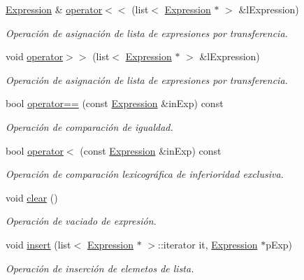\begin{DoxyCompactItemize}
\hyperlink{class_expression}{Expression} \& \hyperlink{class_expression_a79f76778966b233f97217ed5c2cdefde}{operator$<$$<$} (list$<$ \hyperlink{class_expression}{Expression} $\ast$ $>$ \&l\+Expression)
\begin{DoxyCompactList}\small\item\em Operación de asignación de lista de expresiones por transferencia. \end{DoxyCompactList}\item 
void \hyperlink{class_expression_a21a202129abc628e19cebc38ad532dcc}{operator$>$$>$} (list$<$ \hyperlink{class_expression}{Expression} $\ast$ $>$ \&l\+Expression)
\begin{DoxyCompactList}\small\item\em Operación de asignación de lista de expresiones por transferencia. \end{DoxyCompactList}\item 
bool \hyperlink{class_expression_a8cd982884bef615b9c79526dce0956f6}{operator==} (const \hyperlink{class_expression}{Expression} \&in\+Exp) const 
\begin{DoxyCompactList}\small\item\em Operación de comparación de igualdad. \end{DoxyCompactList}\item 
bool \hyperlink{class_expression_a4f1f64418752d14e116f55b7b57355b8}{operator$<$} (const \hyperlink{class_expression}{Expression} \&in\+Exp) const 
\begin{DoxyCompactList}\small\item\em Operación de comparación lexicográfica de inferioridad exclusiva. \end{DoxyCompactList}\item 
void \hyperlink{class_expression_ab2e0ccb0146cccd559c39f8913f9585e}{clear} ()
\begin{DoxyCompactList}\small\item\em Operación de vaciado de expresión. \end{DoxyCompactList}\item 
void \hyperlink{class_expression_a2f087974bb5cee7d0ea06838f5d68ba8}{insert} (list$<$ \hyperlink{class_expression}{Expression} $\ast$ $>$\+::iterator it, \hyperlink{class_expression}{Expression} $\ast$p\+Exp)
\begin{DoxyCompactList}\small\item\em Operación de inserción de elemetos de lista. \end{DoxyCompactList}\item 

\end{DoxyCompactItemize}
